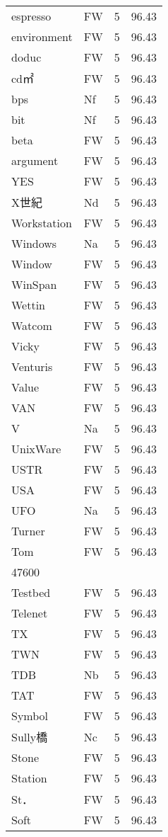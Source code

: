 \documentclass[twocolumn]{book}
\begin{document}
\begin{supertabular}{llrr}
espresso & FW & 5 &  96.43\\
environment & FW & 5 &  96.43\\
doduc & FW & 5 &  96.43\\
cd㎡ & FW & 5 &  96.43\\
bps & Nf & 5 &  96.43\\
bit & Nf & 5 &  96.43\\
beta & FW & 5 &  96.43\\
argument & FW & 5 &  96.43\\
YES & FW & 5 &  96.43\\
X世紀 & Nd & 5 &  96.43\\
Workstation & FW & 5 &  96.43\\
Windows & Na & 5 &  96.43\\
Window & FW & 5 &  96.43\\
WinSpan & FW & 5 &  96.43\\
Wettin & FW & 5 &  96.43\\
Watcom & FW & 5 &  96.43\\
Vicky & FW & 5 &  96.43\\
Venturis & FW & 5 &  96.43\\
Value & FW & 5 &  96.43\\
VAN & FW & 5 &  96.43\\
V & Na & 5 &  96.43\\
UnixWare & FW & 5 &  96.43\\
USTR & FW & 5 &  96.43\\
USA & FW & 5 &  96.43\\
UFO & Na & 5 &  96.43\\
Turner & FW & 5 &  96.43\\
Tom & FW & 5 &  96.43\\
47600\\
Testbed & FW & 5 &  96.43\\
Telenet & FW & 5 &  96.43\\
TX & FW & 5 &  96.43\\
TWN & FW & 5 &  96.43\\
TDB & Nb & 5 &  96.43\\
TAT & FW & 5 &  96.43\\
Symbol & FW & 5 &  96.43\\
Sully橋 & Nc & 5 &  96.43\\
Stone & FW & 5 &  96.43\\
Station & FW & 5 &  96.43\\
St． & FW & 5 &  96.43\\
Soft & FW & 5 &  96.43\\

\end{supertabular}
\end{document}
